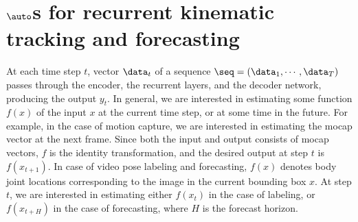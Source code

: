 \documentclass[10pt,twocolumn,letterpaper]{article}
\begin{document}
  

   




 
%    
   \section{$\auto$s for recurrent kinematic tracking and forecasting}%
At  each time step $t$, vector $\data_t$ of a sequence  $\seq=(\data_1, \cdots, \data_T)$ passes through the encoder, the recurrent layers, and the decoder network, producing the output $y_t$. 
In general, we are interested in estimating some function $f(x)$ of the input $x$ at the current time step, or at some time in the future. For example, in the case of motion capture, we are interested in estimating the mocap vector at the next frame. Since both the input and output consists of mocap vectors, $f$ is the identity transformation, and the desired output at step $t$ is $f(x_{t+1})$.
In case of video pose labeling and forecasting, $f(x)$ denotes body joint locations corresponding to the image in the current bounding box $x$. At step $t$, we are interested in estimating either $f(x_t)$ in the case of labeling, or $f(x_{t+H})$ in the case of forecasting, where $H$ is the forecast horizon.
\end{document}
